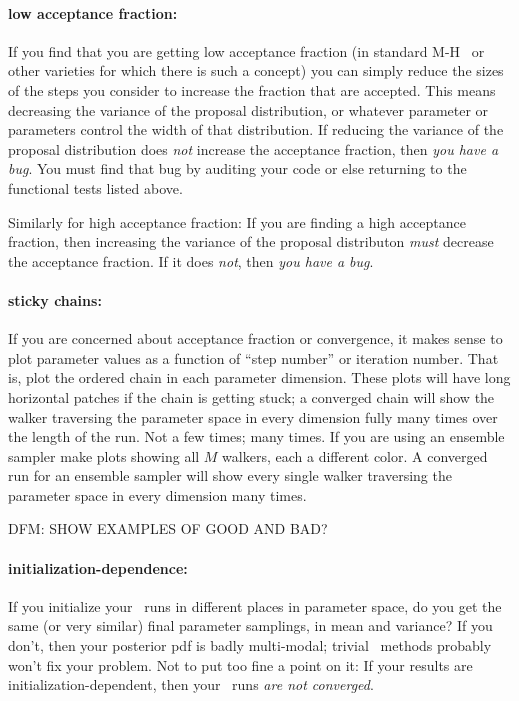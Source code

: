 \documentclass[12pt,twoside,pdftex]{article}
\newcommand{\MCMC}{\acronym{MCMC}}
\begin{document}
\paragraph{low acceptance fraction:}
If you find that you are getting low acceptance fraction
  (in standard M-H \MCMC\ or other varieties for which there is such a concept)
  you can simply reduce the sizes of the steps you consider to increase the fraction that are accepted.
This means decreasing the variance of the proposal distribution,
  or whatever parameter or parameters control the width of that distribution.
If reducing the variance of the proposal distribution does \emph{not} increase the acceptance fraction,
  then \emph{you have a bug}.
You must find that bug by auditing your code or else returning to the functional tests listed above.

Similarly for high acceptance fraction:
If you are finding a high acceptance fraction,
  then increasing the variance of the proposal distributon \emph{must} decrease the acceptance fraction.
If it does \emph{not}, then \emph{you have a bug}.

\paragraph{sticky chains:}
If you are concerned about acceptance fraction or convergence,
  it makes sense to plot parameter values as a function of ``step number'' or iteration number.
That is, plot the ordered chain in each parameter dimension.
These plots will have long horizontal patches if the chain is getting stuck;
  a converged chain will show the walker traversing the parameter space in every dimension fully many times
  over the length of the run.
Not a few times; many times.
If you are using an ensemble sampler
  make plots showing all $M$ walkers, each a different color.
A converged run for an ensemble sampler will show every single walker traversing the parameter space
  in every dimension many times.

DFM: SHOW EXAMPLES OF GOOD AND BAD?

\paragraph{initialization-dependence:}
If you initialize your \MCMC\ runs in different places in parameter space,
  do you get the same (or very similar) final parameter samplings,
  in mean and variance?
If you don't,
  then your posterior pdf is badly multi-modal;
  trivial \MCMC\ methods probably won't fix your problem.
Not to put too fine a point on it:
If your results are initialization-dependent,
  then your \MCMC\ runs \emph{are not converged}.
\end{document}
